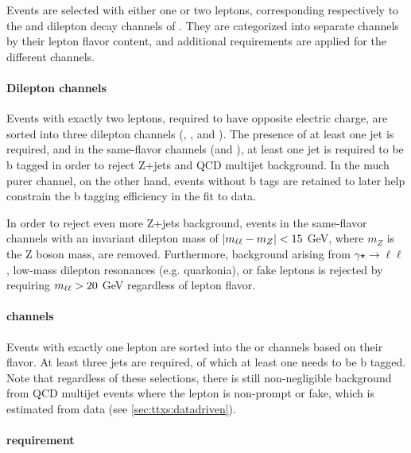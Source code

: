 Events are selected with either one or two leptons, corresponding respectively to the \ljets and dilepton decay channels of \ttbar. They are categorized into separate channels by their lepton flavor content, and additional requirements are applied for the different channels. 

\paragraph{Dilepton channels}

Events with exactly two leptons, required to have opposite electric charge, are sorted into three dilepton channels (\emu, \ee, and \mumu). The presence of at least one jet is required, and in the same-flavor channels (\ee and \mumu), at least one jet is required to be b tagged in order to reject Z+jets and QCD multijet background. In the much purer \emu channel, on the other hand, events without b tags are retained to later help constrain the b tagging efficiency in the fit to data.

In order to reject even more Z+jets background, events in the same-flavor channels with an invariant dilepton mass of $| m_{\ell\ell} - m_Z | < 15$ GeV, where $m_Z$ is the Z boson mass, are removed. Furthermore, background arising from $\gamma\star \rightarrow \ell\ell$, low-mass dilepton resonances (e.g. quarkonia), or fake leptons is rejected by requiring $m_{\ell\ell} > 20$ GeV regardless of lepton flavor.

\paragraph{\ljets channels}

Events with exactly one lepton are sorted into the \ejets or \mujets channels based on their flavor. At least three jets are required, of which at least one needs to be b tagged. Note that regardless of these selections, there is still non-negligible background from QCD multijet events where the lepton is non-prompt or fake, which is estimated from data (see \cref{sec:ttxs:datadriven}).

\paragraph{\pt requirement}

